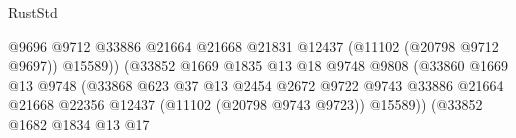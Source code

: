 \begin{lexlean}{RustStd}
\begin{coremodule}
                                                          @9696
                                                          @9712
                                                          @33886
                                                          @21664
                                                          @21668
                                                          @21831
                                                          @12437
                                                          (@11102 (@20798 @9712 @9697))
                                                          @15589))
                                                      (@33852
                                                        @1669
                                                        @1835
                                                        @13
                                                        @18
                                                        @9748
                                                        @9808
                                                        (@33860
                                                          @1669
                                                          @13
                                                          @9748
                                                          (@33868
                                                            @623
                                                            @37
                                                            @13
                                                            @2454
                                                            @2672
                                                            @9722
                                                            @9743
                                                            @33886
                                                            @21664
                                                            @21668
                                                            @22356
                                                            @12437
                                                            (@11102 (@20798 @9743 @9723))
                                                            @15589))
                                                        (@33852
                                                          @1682
                                                          @1834
                                                          @13
                                                          @17

\end{coremodule}
\end{lexlean}
